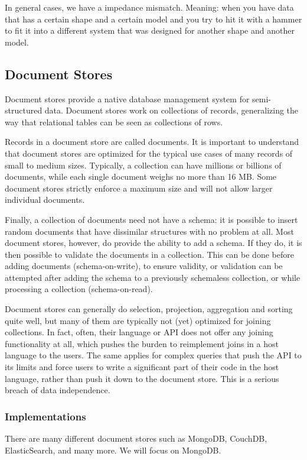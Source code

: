 In general cases, we have a impedance mismatch. Meaning: when you have data that has a certain shape and a certain model and you try to hit it with a hammer to fit it into a different system that was designed for another shape and another model.

\subsection{Document Stores}
Document stores provide a native database management system for semi-structured data. Document stores work on collections of records, generalizing the way that relational tables can be seen as collections of rows.

Records in a document store are called documents. It is important to understand that document stores are optimized for the typical use cases of many records of small to medium sizes. Typically, a collection can have millions or billions of documents, while each single document weighs no more than 16 MB. Some document stores strictly enforce a maximum size and will not allow larger individual documents.

Finally, a collection of documents need not have a schema: it is possible to insert random documents that have dissimilar structures with no problem at all. Most document stores, however, do provide the ability to add a schema. If they do, it is then possible to validate the documents in a collection. This can be done before adding documents (schema-on-write), to ensure validity, or validation can be attempted after adding the schema to a previously schemaless collection, or while processing a collection (schema-on-read).

Document stores can generally do selection, projection, aggregation and sorting quite well, but many of them are typically not (yet) optimized for joining collections. In fact, often, their language or API does not offer any joining functionality at all, which pushes the burden to reimplement joins in a host language to the users. The same applies for complex queries that push the API to its limits and force users to write a significant part of their code in the host language, rather than push it down to the document store. This is a serious breach of data independence.


\subsubsection{Implementations}
There are many different document stores such as MongoDB, CouchDB, ElasticSearch, and many more. We will focus on MongoDB.

